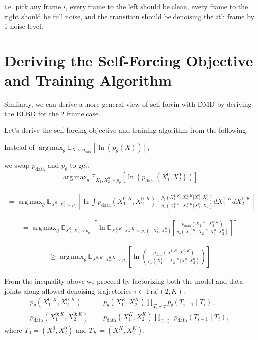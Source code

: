 \documentclass[11pt]{article}
\DeclareMathOperator*{\argmax}{arg\,max}
\begin{document}
i.e. pick any frame $i$, every frame to the left should be clean, every frame to the right should be full noise, and the transition should be denoising the $i$th frame by 1 noise level.


\section{Deriving the Self-Forcing Objective and Training Algorithm}

Similarly, we can derive a more general view of self forcin with DMD by deriving the ELBO for the 2 frame case.


Let's derive the self-forcing objective and training algorithm from the following:

Instead of $\argmax_\theta \mathbb{E}_{X \sim p_{\text{data}}} \left[ \ln(p_\theta(X)) \right]$,

we swap $p_{\text{data}}$ and $p_\theta$ to get:
\begin{align}
\argmax_\theta \mathbb{E}_{X_1^0, X_2^0 \sim p_\theta} \left[ \ln(p_{\text{data}}(X_1^0, X_2^0)) \right]
\end{align}

\begin{align}
= \argmax_\theta \mathbb{E}_{X_1^0, X_2^0 \sim p_\theta} \left[ \ln \int p_{\text{data}}(X_1^{0:K}, X_2^{0:K}) \cdot \frac{p_\theta(X_1^{1:K}, X_2^{1:K} | X_1^0, X_2^0)}{p_\theta(X_1^{1:K}, X_2^{1:K} | X_1^0, X_2^0)} dX_1^{1:K} dX_2^{1:K} \right]
\end{align}

\begin{align}
= \argmax_\theta \mathbb{E}_{X_1^0, X_2^0 \sim p_\theta, } \left[ \ln \mathbb{E}_{X_1^{1:K}, X_2^{1:K} \sim p_\theta(\cdot | X_1^0, X_2^0)} \left[ \frac{p_{\text{data}}(X_1^{0:K}, X_2^{0:K})}{p_\theta(X_1^{1:K}, X_2^{1:K} | X_1^0, X_2^0)} \right] \right]
\end{align}

\begin{align}
\geq \argmax_\theta \mathbb{E}_{X_1^{0:K}, X_2^{0:K} \sim p_\theta} \left[ \ln \left( \frac{p_{\text{data}}(X_1^{0:K}, X_2^{0:K})}{p_\theta(X_1^{1:K}, X_2^{1:K} | X_1^0, X_2^0)} \right) \right]
\end{align}

From the inequality above we proceed by factorizing both the model and
data joints along allowed denoising trajectories
$\tau \in \mathrm{Traj}(2,K)$:
\begin{align}
p_\theta(X_1^{0:K},X_2^{0:K})
  &= p_\theta(X_1^K,X_2^K)\prod_{T_i\in\tau} p_\theta(T_{i-1}\mid T_i),\\
p_{\text{data}}(X_1^{0:K},X_2^{0:K})
  &= p_{\text{data}}(X_1^K,X_2^K)\prod_{T_i\in\tau} p_{\text{data}}(T_{i-1}\mid T_i),
\end{align}
where $T_0=(X_1^0,X_2^0)$ and $T_K=(X_1^K,X_2^K)$.
\end{document}
